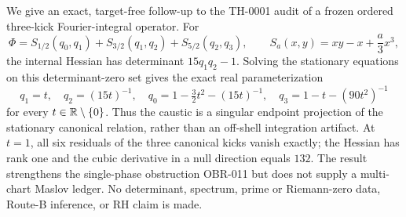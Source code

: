 We give an exact, target-free follow-up to the TH-0001 audit of a frozen
ordered three-kick Fourier-integral operator.  For
\[
 \Phi=S_{1/2}(q_0,q_1)+S_{3/2}(q_1,q_2)+S_{5/2}(q_2,q_3),
 \qquad S_a(x,y)=xy-x+\frac{a}{3}x^3,
\]
the internal Hessian has determinant \(15q_1q_2-1\).  Solving the stationary
equations on this determinant-zero set gives the exact real parameterization
\[
 q_1=t,\quad q_2=(15t)^{-1},\quad
 q_0=1-\tfrac32t^2-(15t)^{-1},\quad
 q_3=1-t-(90t^2)^{-1}
\]
for every \(t\in\mathbb{R}\setminus\{0\}\).  Thus the caustic is a singular endpoint
projection of the stationary canonical relation, rather than an off-shell
integration artifact.  At \(t=1\), all six residuals of the three canonical
kicks vanish exactly; the Hessian has rank one and the cubic derivative in a
null direction equals \(132\).  The result strengthens the single-phase
obstruction OBR-011 but does not supply a multi-chart Maslov ledger.  No
determinant, spectrum, prime or Riemann-zero data, Route-B inference, or RH
claim is made.
